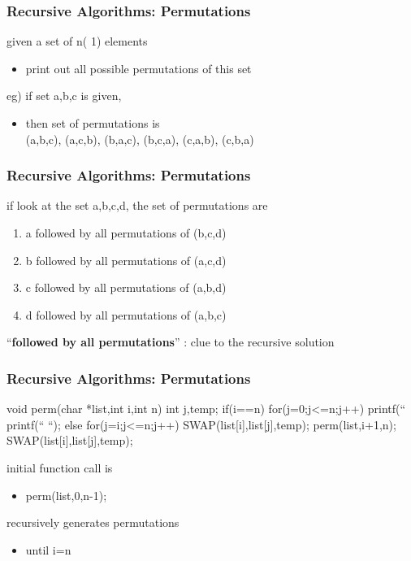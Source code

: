 \documentclass[newPxFont,sthlmFooter,nooffset]{beamer}
\begin{document}
\begin{frame}[t]
  \frametitle{Recursive Algorithms: Permutations}
given a set of n( 1) elements 
\begin{itemize}
\item print out all possible permutations of this set
\end{itemize}


eg) if set {a,b,c} is given,
\begin{itemize}
\item then set of permutations is \\
      {(a,b,c), (a,c,b), (b,a,c), (b,c,a),
    (c,a,b), (c,b,a)}
\end{itemize}

\end{frame}

\begin{frame}[t]
  \frametitle{Recursive Algorithms: Permutations}
if look at the set {a,b,c,d}, the set of permutations are

\begin{enumerate}
\item a followed by all permutations of (b,c,d)
\item b followed by all permutations of (a,c,d)
\item c followed by all permutations of (a,b,d)
\item d followed by all permutations of (a,b,c)
\end{enumerate}

``\textbf{followed by all permutations}'' : clue to the recursive solution
\end{frame}

\begin{frame}[t, fragile]
  \frametitle{Recursive Algorithms: Permutations}
\begin{codedef}
void perm(char *list,int i,int n) {
   int j,temp;
   if(i==n) {
      for(j=0;j<=n;j++)
      printf(“%
      printf(“     “);
   }
   else {
      for(j=i;j<=n;j++) {
         SWAP(list[i],list[j],temp);
         perm(list,i+1,n);
         SWAP(list[i],list[j],temp);
       }
   }  
}  
\end{codedef}

initial function call is
\begin{itemize}
\item perm(list,0,n-1);
\end{itemize}

recursively generates permutations
\begin{itemize}
\item until i=n
\end{itemize}

\end{frame}
\end{document}
